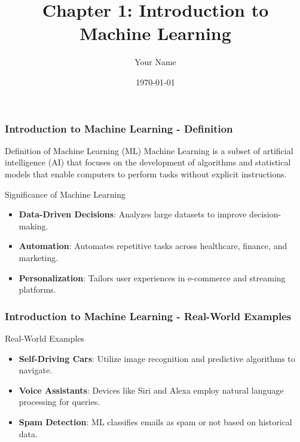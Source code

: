 \documentclass{beamer}
\title{Chapter 1: Introduction to Machine Learning}
\author{Your Name}
\institute{Your Institution}
\date{\today}
\begin{document}
\frame{\titlepage}

\begin{frame}[fragile]
    \frametitle{Introduction to Machine Learning - Definition}
    \begin{block}{Definition of Machine Learning (ML)}
        Machine Learning is a subset of artificial intelligence (AI) that focuses on the development of algorithms and statistical models that enable computers to perform tasks without explicit instructions.
    \end{block}
    \begin{block}{Significance of Machine Learning}
        \begin{itemize}
            \item \textbf{Data-Driven Decisions}: Analyzes large datasets to improve decision-making.
            \item \textbf{Automation}: Automates repetitive tasks across healthcare, finance, and marketing.
            \item \textbf{Personalization}: Tailors user experiences in e-commerce and streaming platforms.
        \end{itemize}
    \end{block}
\end{frame}

\begin{frame}[fragile]
    \frametitle{Introduction to Machine Learning - Real-World Examples}
    \begin{block}{Real-World Examples}
        \begin{itemize}
            \item \textbf{Self-Driving Cars}: Utilize image recognition and predictive algorithms to navigate.
            \item \textbf{Voice Assistants}: Devices like Siri and Alexa employ natural language processing for queries.
            \item \textbf{Spam Detection}: ML classifies emails as spam or not based on historical data.
        \end{itemize}
    \end{block}
\end{frame}
\end{document}
